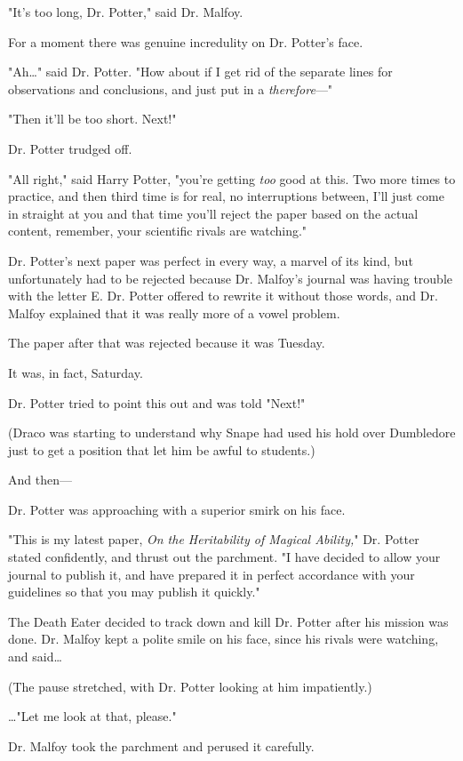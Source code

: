 "It's too long, Dr. Potter," said Dr. Malfoy.

For a moment there was genuine incredulity on Dr. Potter's face.

"Ah{\ldots}" said Dr. Potter. "How about if I get rid of the separate lines for
observations and conclusions, and just put in a \emph{therefore}---"

"Then it'll be too short. Next!"

Dr. Potter trudged off.

"All right," said Harry Potter, "you're getting \emph{too} good at this. Two
more times to practice, and then third time is for real, no interruptions
between, I'll just come in straight at you and that time you'll reject the
paper based on the actual content, remember, your scientific rivals are
watching."

Dr. Potter's next paper was perfect in every way, a marvel of its kind, but
unfortunately had to be rejected because Dr. Malfoy's journal was having
trouble with the letter E\@. Dr. Potter offered to rewrite it without those
words, and Dr. Malfoy explained that it was really more of a vowel problem.

The paper after that was rejected because it was Tuesday.

It was, in fact, Saturday.

Dr. Potter tried to point this out and was told "Next!"

(Draco was starting to understand why Snape had used his hold over Dumbledore
just to get a position that let him be awful to students.)

And then---

Dr. Potter was approaching with a superior smirk on his face.

"This is my latest paper, \emph{On the Heritability of Magical Ability,}" Dr.
Potter stated confidently, and thrust out the parchment. "I have decided to
allow your journal to publish it, and have prepared it in perfect accordance
with your guidelines so that you may publish it quickly."

The Death Eater decided to track down and kill Dr. Potter after his mission was
done. Dr. Malfoy kept a polite smile on his face, since his rivals were
watching, and said{\ldots}

(The pause stretched, with Dr. Potter looking at him impatiently.)

{\ldots}"Let me look at that, please."

Dr. Malfoy took the parchment and perused it carefully.

